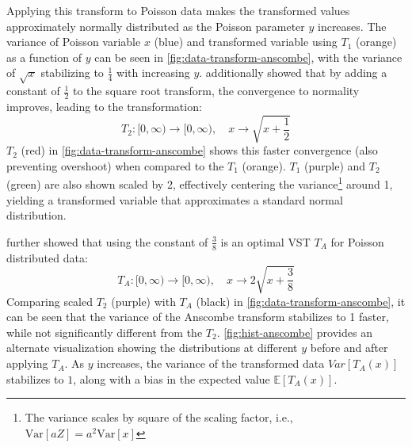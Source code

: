 Applying this transform to Poisson data makes the transformed values approximately normally distributed as the Poisson parameter $y$ increases. The variance of Poisson variable $x$ (blue) and transformed variable using $T_1$ (orange) as a function of $y$ can be seen in \cref{fig:data-transform-anscombe}, with the variance of $\sqrt{x}$ stabilizing to $\frac{1}{4}$ with increasing $y$. \citeauthor{bartlettSquareRootTransformation1936} additionally showed that by adding a constant of $\frac{1}{2}$ to the square root transform, the convergence to normality improves, leading to the transformation:
\begin{equation}
    T_2: [0, \infty) \to [0, \infty), \quad x \to \sqrt{x + \frac{1}{2}}
\end{equation}
$T_2$ (red) in \cref{fig:data-transform-anscombe} shows this faster convergence (also preventing overshoot) when compared to the $T_1$ (orange). $T_1$ (purple) and $T_2$ (green) are also shown scaled by \num{2}, effectively centering the variance\footnote{The variance scales by square of the scaling factor, i.e., $\text{Var}[aZ] = a^2 \text{Var}[x]$} around \num{1}, yielding a transformed variable that approximates a standard normal distribution.

\citeauthor{anscombeTransformationPoissonBinomial1948} \cite{anscombeTransformationPoissonBinomial1948} further showed that using the  constant of $\frac{3}{8}$ is an optimal \gls{VST} $T_A$ for Poisson distributed data:
\begin{equation}\label{eq:anscombe-transform}
    T_A: [0, \infty) \to [0, \infty), \quad x \to 2 \sqrt{x + \frac{3}{8}}
\end{equation}
Comparing scaled $T_2$ (purple) with $T_A$ (black) in \cref{fig:data-transform-anscombe}, it can be seen that the variance of the Anscombe transform stabilizes to \num{1} faster, while not significantly different from the $T_2$. \cref{fig:hist-anscombe} provides an alternate visualization showing the distributions at different $y$ before and after applying $T_A$. As $y$ increases, the variance of the transformed data $Var[T_A(x)]$ stabilizes to $1$, along with a bias in the expected value $\mathbb{E}[T_A(x)]$.


